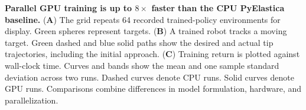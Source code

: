 \caption{\textbf{Parallel GPU training is up to $8\times$ faster than the CPU PyElastica baseline.}
(\textbf{A}) The grid repeats 64 recorded trained-policy environments for display. Green spheres represent targets.
(\textbf{B}) A trained robot tracks a moving target. Green dashed and blue solid paths show the desired and actual tip trajectories, including the initial approach.
(\textbf{C}) Training return is plotted against wall-clock time. Curves and bands show the mean and one sample standard deviation across two runs. Dashed curves denote CPU runs. Solid curves denote GPU runs. Comparisons combine differences in model formulation, hardware, and parallelization.}
